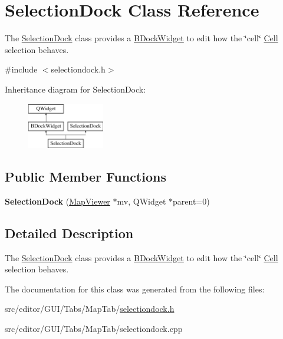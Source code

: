 \hypertarget{class_selection_dock}{\section{\-Selection\-Dock \-Class \-Reference}
\label{class_selection_dock}
}


\-The \hyperlink{class_selection_dock}{\-Selection\-Dock} class provides a \hyperlink{class_b_dock_widget}{\-B\-Dock\-Widget} to edit how the \char`\"{}cell\char`\"{} \hyperlink{class_cell}{\-Cell} selection behaves.  




{\ttfamily \#include $<$selectiondock.\-h$>$}

\-Inheritance diagram for \-Selection\-Dock\-:\begin{figure}[H]
\begin{center}
\leavevmode
\includegraphics[height=2.000000cm]{class_selection_dock}
\end{center}
\end{figure}
\subsection*{\-Public \-Member \-Functions}
\begin{DoxyCompactItemize}
\item 
\hypertarget{class_selection_dock_a91607ae2abc9aabc3fecfdd10c08571c}{{\bfseries \-Selection\-Dock} (\hyperlink{class_map_viewer}{\-Map\-Viewer} $\ast$mv, \-Q\-Widget $\ast$parent=0)}\label{class_selection_dock_a91607ae2abc9aabc3fecfdd10c08571c}

\end{DoxyCompactItemize}


\subsection{\-Detailed \-Description}
\-The \hyperlink{class_selection_dock}{\-Selection\-Dock} class provides a \hyperlink{class_b_dock_widget}{\-B\-Dock\-Widget} to edit how the \char`\"{}cell\char`\"{} \hyperlink{class_cell}{\-Cell} selection behaves. 

\-The documentation for this class was generated from the following files\-:\begin{DoxyCompactItemize}
\item 
src/editor/\-G\-U\-I/\-Tabs/\-Map\-Tab/\hyperlink{selectiondock_8h}{selectiondock.\-h}\item 
src/editor/\-G\-U\-I/\-Tabs/\-Map\-Tab/selectiondock.\-cpp\end{DoxyCompactItemize}
